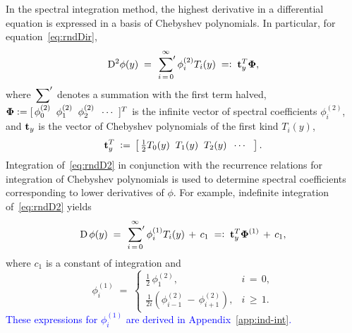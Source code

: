 \documentclass[%
secnumarabic,%
 amssymb, amsmath,%
 aps,prf,superscriptaddress,longbibliography
frontmatterverbose,
]{revtex4-2}
\newcommand{\tcb}{\textcolor{blue}}
\newcommand{\DefinedAs}[0]{\mathrel{\mathop:}=}
\newcommand{\AsDefined}[0]{=\mathrel{\mathop:}}
\begin{document}
In the spectral integration method, the highest derivative in a differential equation is expressed in a basis of Chebyshev polynomials. In particular, for equation~\eqref{eq:rndDir},
\begin{align}
  \D^2\phi (y) \;=\; 
  	\sideset{}{'}\sum_{i \, = \, 0}^{\infty} \phi_i^{(2)} T_i(y)
 	\; \AsDefined \;
	  \HH t_y^T \BB \Phi,
	  \label{eq:rndD2}
\end{align}
where $\sideset{}{'}\sum$ denotes a summation with the first term halved, $\BB \Phi \DefinedAs [\,\phi^{(2)}_0\;\; \phi^{(2)}_1\;\; \phi^{(2)}_2 \;\; \cdots \;\; ]^T$ is the infinite vector of spectral coefficients $\phi_i^{(2)}$, and $\mathbf{t}_y$ is the vector of Chebyshev polynomials of the first kind $T_i(y)$,
\begin{equation}\label{eq:t}
  \HH t_y^T \; \DefinedAs \, \left[\,\tfrac{1}{2}T_0(y)\;\; T_1(y)\;\; T_2(y)\;\;  \cdots \;\;\; \right].
\end{equation}
Integration of~\eqref{eq:rndD2} in conjunction with the recurrence relations for integration of Chebyshev polynomials is used to determine spectral coefficients corresponding to lower derivatives of $\phi$. For example, indefinite integration of~\eqref{eq:rndD2} yields
\begin{align}
  \D\, \phi (y) \;=\; \sideset{}{'}\sum_{i \, = \, 0}^{\infty} \phi_i^{(1)} T_i(y) \,+\, c_1 
  \; \AsDefined \;
	  \HH t_y^T \BB \Phi^{(1)} \,+\, c_1, \label{eq:rndD1}
  \end{align}
where $c_1$ is a constant of integration and %
\begin{equation}\label{ss}
  \phi_i^{(1)} \;=\;
  \begin{cases}
    \tfrac{1}{2} \, \phi_1^{(2)}, & i \, = \, 0,
    \\[0.1cm]
  \tfrac{1}{2i} (\phi_{i-1}^{(2)}\,-\,\phi_{i+1}^{(2)}), &  i \, \geq \, 1.
  \end{cases}
  \end{equation}
\tcb{These expressions for $\phi_i^{(1)}$ are derived in Appendix~\ref{app:ind-int}.}

\end{document}
